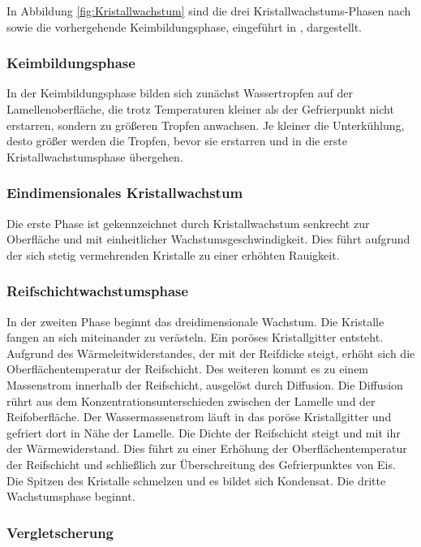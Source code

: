 In Abbildung \ref{fig:Kristallwachstum} sind die drei Kristallwachstums-Phasen nach \textsc{\citeauthor{Hayashi1977}} sowie die vorhergehende Keimbildungsphase, eingeführt in \citep{Sahinagic2004}, dargestellt. 

\subsubsection*{Keimbildungsphase}

In der Keimbildungsphase bilden sich zunächst Wassertropfen auf der Lamellenoberfläche, die trotz Temperaturen kleiner als der Gefrierpunkt nicht erstarren, sondern zu größeren Tropfen anwachsen. Je kleiner die Unterkühlung, desto größer werden die Tropfen, bevor sie erstarren und in die erste Kristallwachstumsphase übergehen. 

\subsubsection*{Eindimensionales Kristallwachstum}
Die erste Phase ist gekennzeichnet durch Kristallwachstum senkrecht zur Oberfläche und mit einheitlicher Wachstumsgeschwindigkeit. Dies führt aufgrund der sich stetig vermehrenden Kristalle zu einer erhöhten Rauigkeit.  

\subsubsection*{Reifschichtwachstumsphase}
In der zweiten Phase beginnt das dreidimensionale Wachstum. Die Kristalle fangen an sich miteinander zu verästeln. Ein poröses Kristallgitter entsteht. Aufgrund des  Wärmeleitwiderstandes, der mit der Reifdicke steigt, erhöht sich die Oberflächentemperatur der Reifschicht. Des weiteren kommt es zu einem Massenstrom innerhalb der Reifschicht, ausgelöst durch Diffusion. Die Diffusion rührt aus  dem  Konzentrationsunterschieden zwischen der Lamelle und der Reifoberfläche. Der Wassermassenstrom läuft in das poröse Kristallgitter und gefriert dort in Nähe der Lamelle. Die Dichte der Reifschicht steigt und mit ihr der Wärmewiderstand. Dies führt zu einer Erhöhung der Oberflächentemperatur der Reifschicht und schließlich zur Überschreitung des Gefrierpunktes von Eis. Die Spitzen des Kristalle schmelzen und es bildet sich Kondensat. Die dritte Wachstumsphase beginnt. 

\subsubsection*{Vergletscherung}

